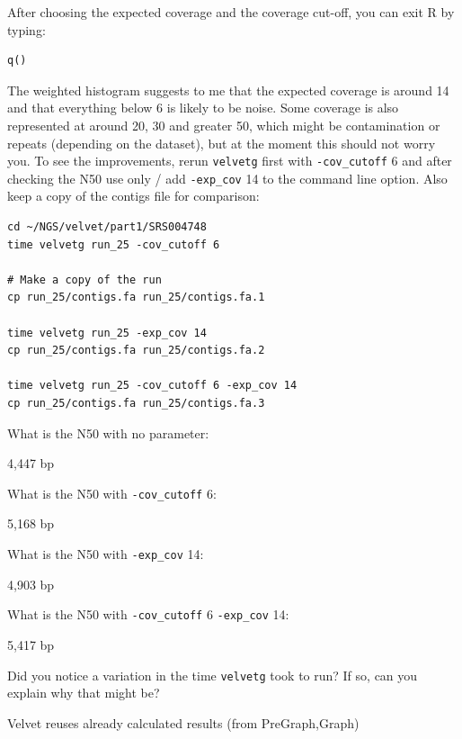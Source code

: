\begin{steps}
After choosing the expected coverage and the coverage cut-off, you can exit R by
typing:
\begin{lstlisting}
q()
\end{lstlisting}
\end{steps}

\begin{steps}
The weighted histogram suggests to me that the expected coverage is around 14
and that everything below 6 is likely to be noise. Some coverage is also
represented at around 20, 30 and greater 50, which might be contamination or
repeats (depending on the dataset), but at the moment this should not worry you.
To see the improvements, rerun \texttt{velvetg} first with \texttt{-cov\_cutoff} 6 and
after checking the N50 use only / add \texttt{-exp\_cov} 14 to the command line
option. Also keep a copy of the contigs file for comparison:
\begin{lstlisting}
cd ~/NGS/velvet/part1/SRS004748
time velvetg run_25 -cov_cutoff 6

# Make a copy of the run
cp run_25/contigs.fa run_25/contigs.fa.1

time velvetg run_25 -exp_cov 14
cp run_25/contigs.fa run_25/contigs.fa.2

time velvetg run_25 -cov_cutoff 6 -exp_cov 14
cp run_25/contigs.fa run_25/contigs.fa.3
\end{lstlisting}
\end{steps}

\begin{questions}
What is the N50 with no parameter:
\begin{answer}
4,447 bp
\end{answer}

What is the N50 with \texttt{-cov\_cutoff} 6:
\begin{answer}
5,168 bp
\end{answer}

What is the N50 with \texttt{-exp\_cov} 14:
\begin{answer}
4,903 bp
\end{answer}

What is the N50 with \texttt{-cov\_cutoff} 6 \texttt{-exp\_cov} 14:
\begin{answer}
5,417 bp
\end{answer}

Did you notice a variation in the time \texttt{velvetg} took to run? If so, can you
explain why that might be?
\begin{answer}
Velvet reuses already calculated results (from PreGraph,Graph)
\end{answer}

\end{questions}

